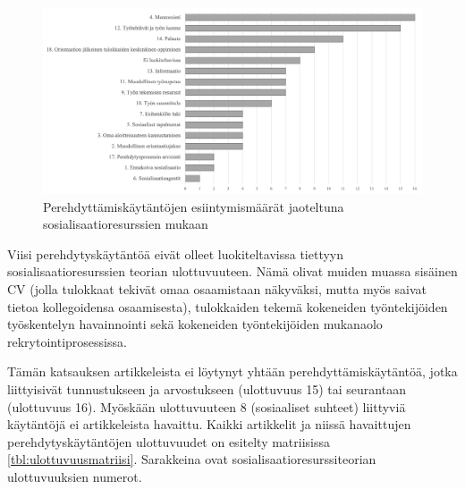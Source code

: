 \documentclass[utf8]{gradu3}
\begin{document}
\begin{figure}[h]
    \centering
    \includegraphics[width=\textwidth]{media/ulottuvuudet.png}
    \caption{Perehdyttämiskäytäntöjen esiintymismäärät jaoteltuna sosialisaatioresurssien \parencite{saks-gruman-2012} mukaan}
    \label{kuvio:ulottuvuudet}
\end{figure}

Viisi perehdytyskäytäntöä eivät olleet luokiteltavissa tiettyyn sosialisaatioresurssien teorian ulottuvuuteen. Nämä olivat muiden muassa sisäinen CV (jolla tulokkaat tekivät omaa osaamistaan näkyväksi, mutta myös saivat tietoa kollegoidensa osaamisesta), tulokkaiden tekemä kokeneiden työntekijöiden työskentelyn havainnointi sekä kokeneiden työntekijöiden mukanaolo rekrytointiprosessissa. 

Tämän katsauksen artikkeleista ei löytynyt yhtään perehdyttämiskäytäntöä, jotka liittyisivät tunnustukseen ja arvostukseen (ulottuvuus 15) tai seurantaan (ulottuvuus 16). Myöskään ulottuvuuteen 8 (sosiaaliset suhteet) liittyviä käytäntöjä ei artikkeleista havaittu. Kaikki artikkelit ja niissä havaittujen perehdytyskäytäntöjen ulottuvuudet on esitelty matriisissa \ref{tbl:ulottuvuusmatriisi}. Sarakkeina ovat sosialisaatioresurssiteorian ulottuvuuksien numerot.

\newpage
\end{document}
